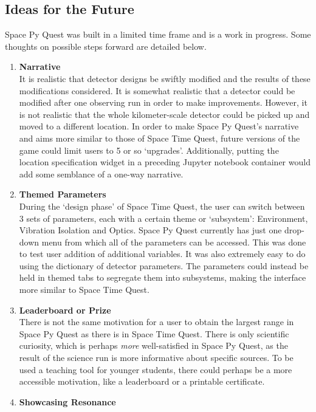 \documentclass{article}
\begin{document}
\subsection{Ideas for the Future}
\label{sec:discussion}
Space Py Quest was built in a limited time frame and is a work in
progress. Some thoughts on possible steps forward are detailed below.
\begin{enumerate}
\item \textbf{Narrative}\\
It is realistic that detector designs be swiftly modified and the
results of these modifications considered. It is somewhat realistic
that a detector could be modified after one observing run in order to
make improvements. However, it is not realistic that the whole
kilometer-scale detector could be picked up and moved to a different
location. In order to make Space Py Quest's narrative and aims more
similar to those of Space Time Quest, future versions of the game
could limit users to 5 or so `upgrades'. Additionally, putting the
location specification widget in a preceding Jupyter notebook
container would add some semblance of a one-way narrative. 
\item \textbf{Themed Parameters} \\
    During the `design phase' of Space Time Quest, the user can switch
    between 3 sets of parameters, each with a certain theme or
    `subsystem': Environment, Vibration Isolation and Optics. Space Py
    Quest currently has just one drop-down menu from which all of the
    parameters can be accessed. This was done to test user addition of
    additional variables. It was also extremely easy to do using the
    dictionary of detector parameters. The parameters could instead be
    held in themed tabs to segregate them into subsystems, making the
    interface more similar to Space Time Quest. 
\item \textbf{Leaderboard or Prize} \\
    There is not the same motivation for a user to obtain the largest
    range in Space Py Quest as there is in Space Time Quest. There is
    only scientific curiosity, which is perhaps \textit{more}
    well-satisfied in Space Py Quest, as the result of the science run
    is more informative about specific sources. To be used a teaching
    tool for younger students, there could perhaps be a more
    accessible motivation, like a leaderboard or a printable
    certificate.
\item \textbf{Showcasing Resonance} \\

\end{enumerate}
\end{document}
